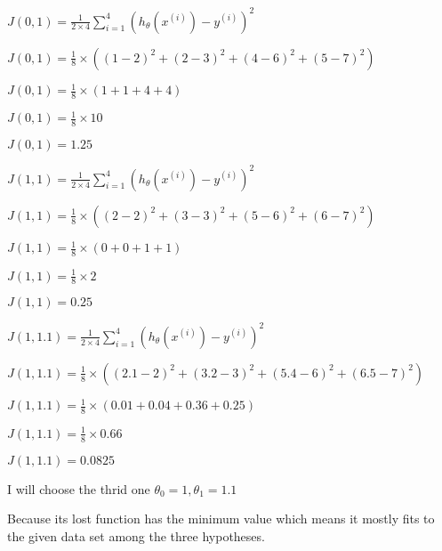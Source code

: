 \documentclass[a4paper]{article}
\begin{document}
$ J(0, 1) = \frac{1}{2 \times 4} {\textstyle \sum_{i=1}^{4}}(h_{\theta}(x^{(i)}) - y^{(i)})^2 $\par
$ J(0, 1) = \frac{1}{8} \times ((1-2)^2+(2-3)^2+(4-6)^2+(5-7)^2) $\par
$ J(0, 1) = \frac{1}{8} \times (1+1+4+4)$\par
$ J(0, 1) = \frac{1}{8} \times 10$\par
$ J(0, 1) = 1.25$\par

\newpage
{}

$ J(1, 1) = \frac{1}{2 \times 4} {\textstyle \sum_{i=1}^{4}}(h_{\theta}(x^{(i)}) - y^{(i)})^2 $\par
$ J(1, 1) = \frac{1}{8} \times ((2-2)^2+(3-3)^2+(5-6)^2+(6-7)^2) $\par
$ J(1, 1) = \frac{1}{8} \times (0+0+1+1)$\par
$ J(1, 1) = \frac{1}{8} \times 2$\par
$ J(1, 1) = 0.25$\par


$ J(1, 1.1) = \frac{1}{2 \times 4} {\textstyle \sum_{i=1}^{4}}(h_{\theta}(x^{(i)}) - y^{(i)})^2 $\par
$ J(1, 1.1) = \frac{1}{8} \times ((2.1-2)^2+(3.2-3)^2+(5.4-6)^2+(6.5-7)^2) $\par
$ J(1, 1.1) = \frac{1}{8} \times (0.01+0.04+0.36+0.25)$\par
$ J(1, 1.1) = \frac{1}{8} \times 0.66$\par
$ J(1, 1.1) = 0.0825$\par


I will choose the thrid one ${\theta}_0 = 1, {\theta}_1 = 1.1$

Because its lost function has the minimum value which means it mostly fits to the given data set among the three hypotheses.
\end{document}
